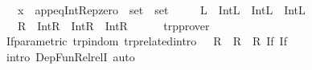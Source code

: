 \begin{isabellebody}
\ \ \ x\ {\isacharequal}{\kern0pt}\ {\isachardoublequoteopen}app{\isacharunderscore}{\kern0pt}eq{\isacharunderscore}{\kern0pt}Int{\isacharunderscore}{\kern0pt}Rep{\isacharunderscore}{\kern0pt}zero\ {\isacharcolon}{\kern0pt}{\isacharcolon}{\kern0pt}\ {\isacharparenleft}{\kern0pt}set\ {\isasymRightarrow}\ set{\isacharparenright}{\kern0pt}\ {\isasymRightarrow}\ {\isacharunderscore}{\kern0pt}{\isachardoublequoteclose}\isanewline
\ \ \ L\ {\isacharequal}{\kern0pt}\ {\isachardoublequoteopen}{\isacharparenleft}{\kern0pt}Int{\isachardot}{\kern0pt}L\ {\isasymRrightarrow}\ Int{\isachardot}{\kern0pt}L{\isacharparenright}{\kern0pt}\ {\isasymRrightarrow}\ Int{\isachardot}{\kern0pt}L\ {\isasymRrightarrow}\ {\isacharparenleft}{\kern0pt}{\isasymlongleftrightarrow}{\isacharparenright}{\kern0pt}{\isachardoublequoteclose}\isanewline
\ \ \ R\ {\isacharequal}{\kern0pt}\ {\isachardoublequoteopen}{\isacharparenleft}{\kern0pt}Int{\isachardot}{\kern0pt}R\ {\isasymRrightarrow}\ Int{\isachardot}{\kern0pt}R{\isacharparenright}{\kern0pt}\ {\isasymRrightarrow}\ Int{\isachardot}{\kern0pt}R\ {\isasymRrightarrow}\ {\isacharparenleft}{\kern0pt}{\isasymlongleftrightarrow}{\isacharparenright}{\kern0pt}{\isachardoublequoteclose}\isanewline
%
\isadelimproof
\ \ %
\endisadelimproof
%
\isatagproof
{}\isamarkupfalse%
\ trp{\isacharunderscore}{\kern0pt}prover%
\endisatagproof
{\isafoldproof}%
%
\isadelimproof
\isanewline
%
\endisadelimproof
\isanewline
{}\isamarkupfalse%
\ If{\isacharunderscore}{\kern0pt}parametric\ {\isacharbrackleft}{\kern0pt}trp{\isacharunderscore}{\kern0pt}in{\isacharunderscore}{\kern0pt}dom{\isacharcomma}{\kern0pt}\ trp{\isacharunderscore}{\kern0pt}related{\isacharunderscore}{\kern0pt}intro{\isacharbrackright}{\kern0pt}{\isacharcolon}{\kern0pt}\ {\isachardoublequoteopen}{\isacharparenleft}{\kern0pt}{\isacharparenleft}{\kern0pt}{\isasymlongleftrightarrow}{\isacharparenright}{\kern0pt}\ {\isasymRrightarrow}\ R\ {\isasymRrightarrow}\ R\ {\isasymRrightarrow}\ R{\isacharparenright}{\kern0pt}\ If\ If{\isachardoublequoteclose}\isanewline
%
\isadelimproof
\ \ %
\endisadelimproof
%
\isatagproof
{}\isamarkupfalse%
\ {\isacharparenleft}{\kern0pt}intro\ Dep{\isacharunderscore}{\kern0pt}Fun{\isacharunderscore}{\kern0pt}Rel{\isacharunderscore}{\kern0pt}relI{\isacharparenright}{\kern0pt}\ auto%
\endisatagproof
{\isafoldproof}%
%
\isadelimproof
\isanewline
%
\endisadelimproof
\isanewline
\isanewline
\isanewline
\isanewline
\isanewline
{}\isamarkupfalse%
\isanewline
%
\isadelimtheory
\isanewline
%
\endisadelimtheory
%
\isatagtheory
{}\isamarkupfalse%
%
\endisatagtheory
{\isafoldtheory}%
%
\isadelimtheory
%
\endisadelimtheory
%
\end{isabellebody}%
